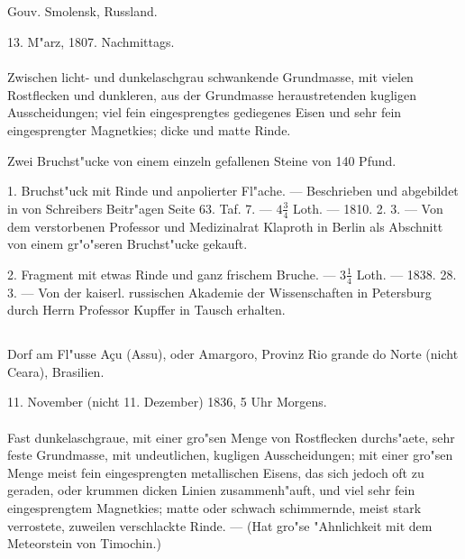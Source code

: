 \documentclass[a4paper, 11pt, oneside, polutonikogreek, german]{article}
\begin{document}
\subsection{}
\begin{center}

Gouv. Smolensk, Russland.

13. M"arz, 1807. Nachmittags.
\end{center}
\paragraph{}
Zwischen licht- und dunkelaschgrau schwankende Grundmasse, mit vielen Rostflecken und dunkleren, aus der Grundmasse heraustretenden kugligen Ausscheidungen; viel fein eingesprengtes gediegenes Eisen und sehr fein eingesprengter Magnetkies; dicke und matte Rinde.

Zwei Bruchst"ucke von einem einzeln gefallenen Steine von 140 Pfund.

1. Bruchst"uck mit Rinde und anpolierter Fl"ache. --- Beschrieben und abgebildet in von Schreibers Beitr"agen Seite 63. Taf. 7. --- $\mathfrak{4\frac{3}{4}}$ Loth. --- 1810. 2. 3. --- Von dem verstorbenen Professor und Medizinalrat Klaproth in Berlin als Abschnitt von einem gr"o"seren Bruchst"ucke gekauft.

2. Fragment mit etwas Rinde und ganz frischem Bruche. --- $\mathfrak{3\frac{1}{4}}$ Loth. --- 1838. 28. 3. --- Von der kaiserl. russischen Akademie der Wissenschaften in Petersburg durch Herrn Professor Kupffer in Tausch erhalten.
\subsection[\swabfamily {Macao.}]{}
\begin{center}

Dorf am Fl"usse Açu (Assu), oder Amargoro, Provinz Rio grande do Norte (nicht Ceara), Brasilien.

11. November (nicht 11. Dezember) 1836, 5 Uhr Morgens.
\end{center}
\paragraph{}
Fast dunkelaschgraue, mit einer gro"sen Menge von Rostflecken durchs"aete, sehr feste Grundmasse, mit undeutlichen, kugligen Ausscheidungen; mit einer gro"sen Menge meist fein eingesprengten metallischen Eisens, das sich jedoch oft zu geraden, oder krummen dicken Linien zusammenh"auft, und viel sehr fein eingesprengtem Magnetkies; matte oder schwach schimmernde, meist stark verrostete, zuweilen verschlackte Rinde. --- (Hat gro"se "Ahnlichkeit mit dem Meteorstein von Timochin.)
\end{document}
